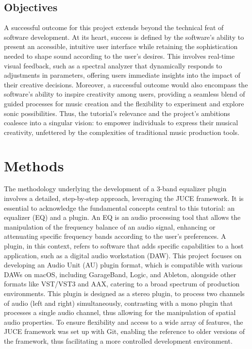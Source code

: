 \documentclass[10pt,twocolumn]{article}
\begin{document}
\subsection{Objectives}
A successful outcome for this project extends beyond the technical feat of software development. At its heart, success is defined by the software's ability to present an accessible, intuitive user interface while retaining the sophistication needed to shape sound according to the user's desires. This involves real-time visual feedback, such as a spectral analyzer that dynamically responds to adjustments in parameters, offering users immediate insights into the impact of their creative decisions. Moreover, a successful outcome would also encompass the software's ability to inspire creativity among users, providing a seamless blend of guided processes for music creation and the flexibility to experiment and explore sonic possibilities. Thus, the tutorial's relevance and the project's ambitions coalesce into a singular vision: to empower individuals to express their musical creativity, unfettered by the complexities of traditional music production tools.


\section{Methods}

The methodology underlying the development of a 3-band equalizer plugin involves a detailed, step-by-step approach, leveraging the JUCE framework. It is essential to acknowledge the fundamental concepts central to this tutorial: an equalizer (EQ) and a plugin. An EQ is an audio processing tool that allows the manipulation of the frequency balance of an audio signal, enhancing or attenuating specific frequency bands according to the user's preferences. A plugin, in this context, refers to software that adds specific capabilities to a host application, such as a digital audio workstation (DAW). This project focuses on developing an Audio Unit (AU) plugin format, which is compatible with various DAWs on macOS, including GarageBand, Logic, and Ableton, alongside other formats like VST/VST3 and AAX, catering to a broad spectrum of production environments. This plugin is designed as a stereo plugin, to process two channels of audio (left and right) simultaneously, contrasting with a mono plugin that processes a single audio channel, thus allowing for the manipulation of spatial audio properties. To ensure flexibility and access to a wide array of features, the JUCE framework was set up with Git, enabling the reference to older versions of the framework, thus facilitating a more controlled development environment.
\end{document}
